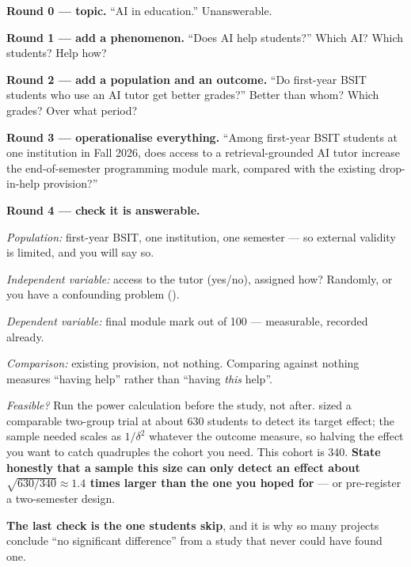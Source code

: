 \begin{worked}
\textbf{Round 0 --- topic.} ``AI in education.'' Unanswerable.

\smallskip
\textbf{Round 1 --- add a phenomenon.} ``Does AI help students?'' Which AI? Which
students? Help how?

\smallskip
\textbf{Round 2 --- add a population and an outcome.} ``Do first-year BSIT students
who use an AI tutor get better grades?'' Better than whom? Which grades? Over what
period?

\smallskip
\textbf{Round 3 --- operationalise everything.} ``Among first-year BSIT students at
one institution in Fall 2026, does access to a retrieval-grounded AI tutor increase
the end-of-semester programming module mark, compared with the existing
drop-in-help provision?''

\smallskip
\textbf{Round 4 --- check it is answerable.}
\begin{tight}
  \item \emph{Population:} first-year BSIT, one institution, one semester --- so
        external validity is limited, and you will say so.
  \item \emph{Independent variable:} access to the tutor (yes/no), assigned how?
        Randomly, or you have a confounding problem ().
  \item \emph{Dependent variable:} final module mark out of 100 --- measurable,
        recorded already.
  \item \emph{Comparison:} existing provision, not nothing. Comparing against
        nothing measures ``having help'' rather than ``having \emph{this} help''.
  \item \emph{Feasible?} Run the power calculation before the study, not after.
         sized a comparable two-group trial at about 630 students
        to detect its target effect; the sample needed scales as $1/\delta^2$
        whatever the outcome measure, so halving the effect you want to catch
        quadruples the cohort you need. This cohort is 340. \textbf{State
        honestly that a sample this size can only detect an effect about
        $\sqrt{630/340} \approx 1.4$ times larger than the one you hoped for}
        --- or pre-register a two-semester design.
\end{tight}

\smallskip
\textbf{The last check is the one students skip}, and it is why so many projects
conclude ``no significant difference'' from a study that never could have found
one.
\end{worked}

